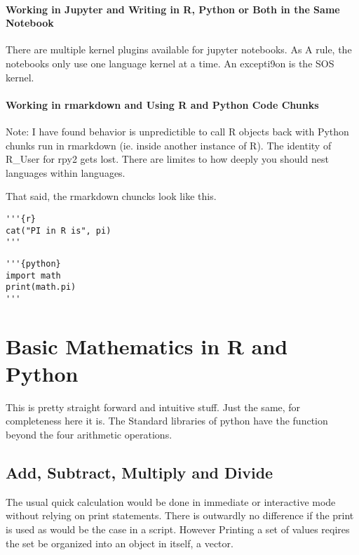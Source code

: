 \documentclass[]{book}
\theoremstyle{definition}
\theoremstyle{definition}
\theoremstyle{definition}
\theoremstyle{remark}
\begin{document}
\subsubsection{Working in Jupyter and Writing in R, Python or Both in
the Same
Notebook}\label{working-in-jupyter-and-writing-in-r-python-or-both-in-the-same-notebook}

There are multiple kernel plugins available for jupyter notebooks. As A
rule, the notebooks only use one language kernel at a time. An
excepti9on is the SOS kernel.

\subsubsection{Working in rmarkdown and Using R and Python Code
Chunks}\label{working-in-rmarkdown-and-using-r-and-python-code-chunks}

Note: I have found behavior is unpredictible to call R objects back with
Python chunks run in rmarkdown (ie. inside another instance of R). The
identity of R\_User for rpy2 gets lost. There are limites to how deeply
you should nest languages within languages.

That said, the rmarkdown chuncks look like this.

\begin{verbatim}
'''{r}
cat("PI in R is", pi)
'''
\end{verbatim}

\begin{verbatim}
'''{python}
import math
print(math.pi)
'''
\end{verbatim}

\chapter{Basic Mathematics in R and
Python}\label{basic-mathematics-in-r-and-python}

This is pretty straight forward and intuitive stuff. Just the same, for
completeness here it is. The Standard libraries of python have the
function beyond the four arithmetic operations.

\section{Add, Subtract, Multiply and
Divide}\label{add-subtract-multiply-and-divide}

The usual quick calculation would be done in immediate or interactive
mode without relying on print statements. There is outwardly no
difference if the print is used as would be the case in a script.
However Printing a set of values reqires the set be organized into an
object in itself, a vector.
\end{document}
